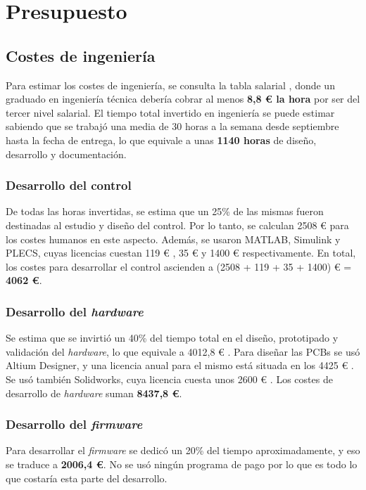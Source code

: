 \newpage
\section{Presupuesto}
\subsection{Costes de ingeniería}

Para estimar los costes de ingeniería, se consulta la tabla salarial \cite{BOE2024}, donde un graduado en ingeniería técnica debería cobrar al menos \textbf{8,8 \euro{}  la hora} por ser del tercer nivel salarial. El tiempo total invertido en ingeniería se puede estimar sabiendo que se trabajó una media de 30 horas a la semana desde septiembre hasta la fecha de entrega, lo que equivale a unas \textbf{1140 horas} de diseño, desarrollo y documentación.

\subsubsection{Desarrollo del control}
De todas las horas invertidas, se estima que un 25\% de las mismas fueron destinadas al estudio y diseño del control. Por lo tanto, se calculan 2508 \euro{} para los costes humanos en este aspecto. Además, se usaron MATLAB, Simulink y PLECS, cuyas licencias cuestan 119 \euro{} \cite{MathWorks2024}, 35 \euro{} \cite{MathWorks2024} y 1400 \euro{} \cite{Plexim2024} respectivamente. En total, los costes para desarrollar el control ascienden a (2508 + 119 + 35 + 1400) \euro{}  = \textbf{4062 \euro{}}.

\subsubsection{Desarrollo del \textit{hardware}}
Se estima que se invirtió un 40\% del tiempo total en el diseño, prototipado y validación del \textit{hardware}, lo que equivale a 4012,8 \euro{} . Para diseñar las PCBs se usó Altium Designer, y una licencia anual para el mismo está situada en los 4425 \euro{} \cite{Altium2024}. Se usó también Solidworks, cuya licencia cuesta unos 2600 \euro{} \cite{GoEngineer2024}. Los costes de desarrollo de \textit{hardware} suman \textbf{8437,8 \euro{}}.

\subsubsection{Desarrollo del \textit{firmware}}
Para desarrollar el \textit{firmware} se dedicó un 20\% del tiempo aproximadamente, y eso se traduce a \textbf{2006,4 \euro{}}. No se usó ningún programa de pago por lo que es todo lo que costaría esta parte del desarrollo.

